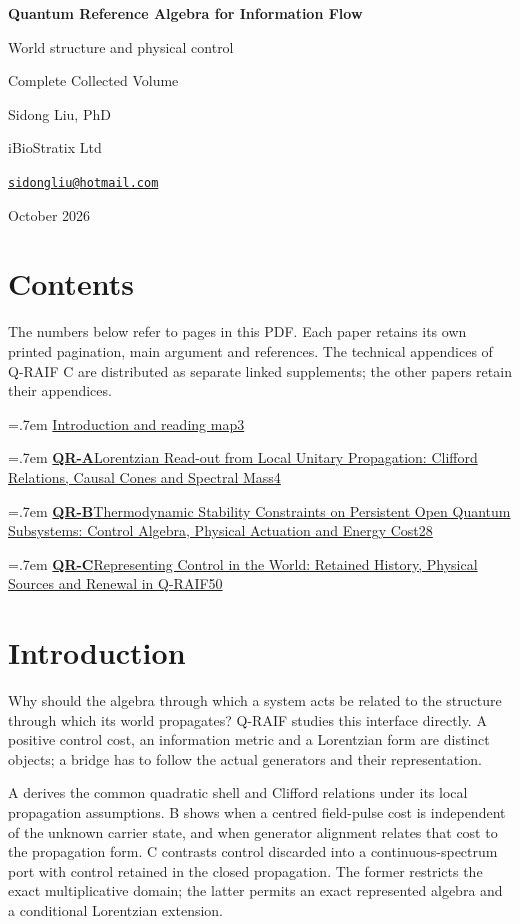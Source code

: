 \documentclass[11pt,a4paper]{article}
\newcommand{\volumeentry}[3]{\par\begingroup\parskip=.7em
  \noindent\href{QRAIF_Complete_Collection.pdf\#page=#3}{\textbf{#1}\quad #2\nobreak\dotfill\nobreak\mbox{#3}}\par\endgroup}
\begin{document}
\begin{titlepage}
\centering
\vspace*{1.6cm}
{\Huge\bfseries Quantum Reference Algebra for Information Flow\par}
\vspace{1cm}
{\Large World structure and physical control\par}
\vfill
{\Large Complete Collected Volume\par}
\vspace{1.6cm}
{\Large Sidong Liu, PhD\par}
\vspace{.3cm}
{iBioStratix Ltd\par}
\href{mailto:sidongliu@hotmail.com}{\texttt{sidongliu@hotmail.com}}\par
\vspace{1cm}
{\large October 2026\par}
\end{titlepage}
\setcounter{page}{2}
\section*{Contents}
The numbers below refer to pages in this PDF. Each paper retains its own printed pagination, main argument and references. The technical appendices of Q-RAIF C are distributed as separate linked supplements; the other papers retain their appendices.
\volumeentry{}{Introduction and reading map}{3}
\volumeentry{QR-A}{Lorentzian Read-out from Local Unitary Propagation: Clifford Relations, Causal Cones and Spectral Mass}{4}
\volumeentry{QR-B}{Thermodynamic Stability Constraints on Persistent Open Quantum Subsystems: Control Algebra, Physical Actuation and Energy Cost}{28}
\volumeentry{QR-C}{Representing Control in the World: Retained History, Physical Sources and Renewal in Q-RAIF}{50}
\clearpage
\section*{Introduction}\label{collection:intro}
Why should the algebra through which a system acts be related to the structure through which its world propagates? Q-RAIF studies this interface directly. A positive control cost, an information metric and a Lorentzian form are distinct objects; a bridge has to follow the actual generators and their representation.

A derives the common quadratic shell and Clifford relations under its local propagation assumptions. B shows when a centred field-pulse cost is independent of the unknown carrier state, and when generator alignment relates that cost to the propagation form. C contrasts control discarded into a continuous-spectrum port with control retained in the closed propagation. The former restricts the exact multiplicative domain; the latter permits an exact represented algebra and a conditional Lorentzian extension.
\end{document}
